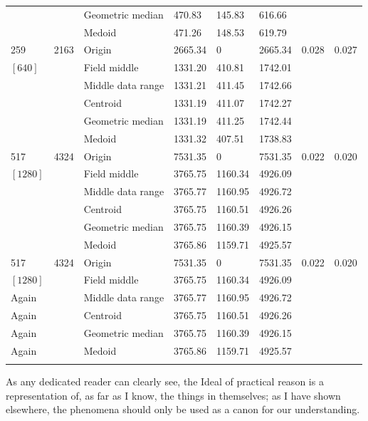 \documentclass[phd,showgrids]{ndsu-thesis-2022}
\begin{document}
{{\begin{ThreePartTable}
\begin{longtable}{lll lll ll}
 &  & Geometric median & 470.83 & 145.83 & 616.66 \\
 &  & Medoid  & 471.26 & 148.53 & 619.79 \\
\midrule
259 & 2163 & Origin  & 2665.34 & 0 & 2665.34 & 0.028 & 0.027 \\
$[640]$ &  & Field middle  & 1331.20 & 410.81 & 1742.01 \\
 &  & Middle data range  & 1331.21 & 411.45 & 1742.66 \\
 &  & Centroid & 1331.19 & 411.07 & 1742.27 \\
 &  & Geometric median & 1331.19 & 411.25 & 1742.44 \\
 &  & Medoid  & 1331.32 & 407.51 & 1738.83 \\
\midrule
517 & 4324 & Origin  & 7531.35 & 0 & 7531.35 & 0.022 & 0.020 \\
$[1280]$ &  & Field middle  & 3765.75 & 1160.34 & 4926.09 \\
 &  & Middle data range  & 3765.77 & 1160.95 & 4926.72 \\
 &  & Centroid & 3765.75 & 1160.51 & 4926.26 \\
 &  & Geometric median & 3765.75 & 1160.39 & 4926.15 \\
 &  & Medoid  & 3765.86 & 1159.71 & 4925.57 \\
\midrule
517 & 4324 & Origin  & 7531.35 & 0 & 7531.35 & 0.022 & 0.020 \\
$[1280]$ &  & Field middle  & 3765.75 & 1160.34 & 4926.09 \\
 Again &  & Middle data range  & 3765.77 & 1160.95 & 4926.72 \\
 Again &  & Centroid & 3765.75 & 1160.51 & 4926.26 \\
 Again &  & Geometric median & 3765.75 & 1160.39 & 4926.15 \\
 Again &  & Medoid  & 3765.86 & 1159.71 & 4925.57 \\
 \label{longtab} %
\end{longtable} 
\end{ThreePartTable}
}
}
\setlength{\parindent}{0.5in}
\vspace{-2ex}

As any dedicated reader can clearly see, the Ideal of practical reason is a representation
of, as far as I know, the things in themselves; as I have shown elsewhere, the phenomena
should only be used as a canon for our understanding.


\end{document}
